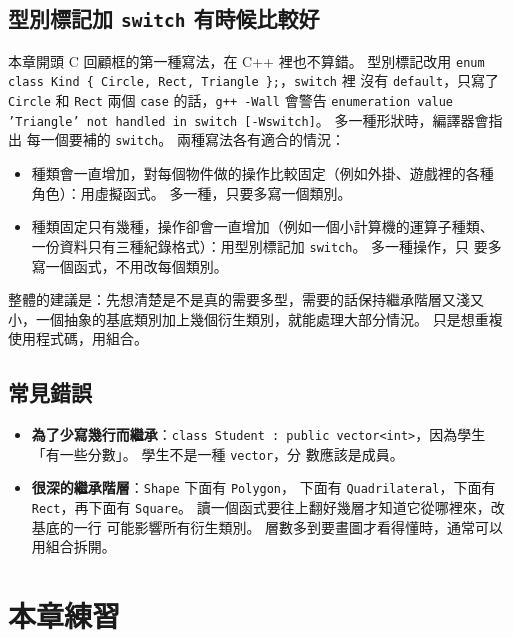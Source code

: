 \subsection{型別標記加 \texttt{switch} 有時候比較好}

本章開頭 C 回顧框的第一種寫法，在 C++ 裡也不算錯。 型別標記改用
\texttt{enum class Kind \{ Circle, Rect, Triangle \};}，\texttt{switch} 裡
沒有 \texttt{default}，只寫了 \texttt{Circle} 和 \texttt{Rect} 兩個
\texttt{case} 的話，\texttt{g++ -Wall} 會警告 \texttt{enumeration value
'Triangle' not handled in switch [-Wswitch]}。 多一種形狀時，編譯器會指出
每一個要補的 \texttt{switch}。 兩種寫法各有適合的情況：

\begin{itemize}
\item 種類會一直增加，對每個物件做的操作比較固定（例如外掛、遊戲裡的各種
角色）：用虛擬函式。 多一種，只要多寫一個類別。
\item 種類固定只有幾種，操作卻會一直增加（例如一個小計算機的運算子種類、
一份資料只有三種紀錄格式）：用型別標記加 \texttt{switch}。 多一種操作，只
要多寫一個函式，不用改每個類別。
\end{itemize}

整體的建議是：先想清楚是不是真的需要多型，需要的話保持繼承階層又淺又
小，一個抽象的基底類別加上幾個衍生類別，就能處理大部分情況。 只是想重複
使用程式碼，用組合。

\subsection{常見錯誤}

\begin{itemize}
\item \textbf{為了少寫幾行而繼承}：\texttt{class Student : public
vector<int>}，因為學生「有一些分數」。 學生不是一種 \texttt{vector}，分
數應該是成員。
\item \textbf{很深的繼承階層}：\texttt{Shape} 下面有 \texttt{Polygon}，
下面有 \texttt{Quadrilateral}，下面有 \texttt{Rect}，再下面有
\texttt{Square}。 讀一個函式要往上翻好幾層才知道它從哪裡來，改基底的一行
可能影響所有衍生類別。 層數多到要畫圖才看得懂時，通常可以用組合拆開。
\end{itemize}

\section{本章練習}
\label{sec:ch7-exercises}


